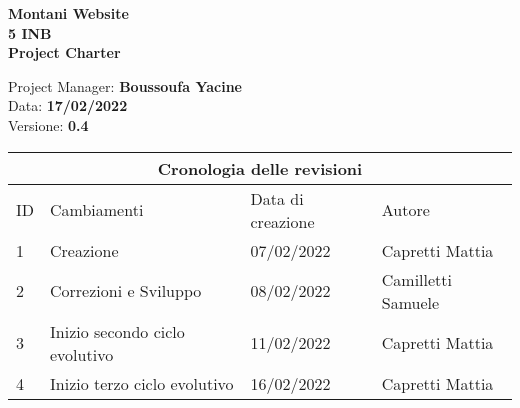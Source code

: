 \documentclass{article}
\begin{document}
	

	

	\begin{titlepage}

		\begin{center}

			\huge\textbf{Montani Website}\\

			\Large\textbf{5 INB}\\

			\Large \textbf{Project Charter}\\

			\vspace{4cm}

			\large Project Manager: \textbf{Boussoufa Yacine}\\

			\large Data: \textbf{17/02/2022}\\

			\large Versione: \textbf{0.4}\\

		\end{center}

	\end{titlepage}

	

	\clearpage

	

	\begin{tabular}{ |p{1cm}|p{4cm}|p{3cm}|p{2cm}|  }

		\hline

		\multicolumn{4}{|c|}{Cronologia delle revisioni} \\

		\hline

		ID& Cambiamenti &Data di creazione&Autore\\

		\hline

		1   & Creazione    &07/02/2022&   Capretti Mattia\\

		\hline

		2   & Correzioni e Sviluppo    &08/02/2022&   Camilletti Samuele\\

		\hline

		3   & Inizio secondo ciclo evolutivo    &11/02/2022&   Capretti Mattia\\

		\hline

		4   & Inizio terzo ciclo evolutivo    &16/02/2022&   Capretti Mattia\\
		
		\hline

	\end{tabular}
\end{document}
